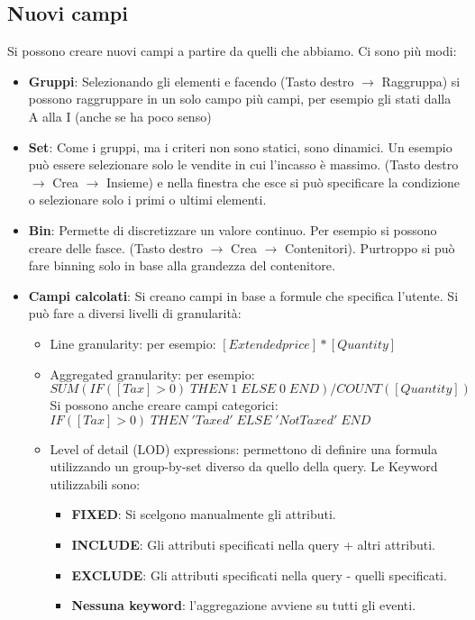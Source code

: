 \subsection{Nuovi campi}
Si possono creare nuovi campi a partire da quelli che abbiamo. Ci sono più modi:
\begin{itemize}
	\item \textbf{Gruppi}: Selezionando gli elementi e facendo (Tasto destro $\xrightarrow{}$ Raggruppa) si possono raggruppare in un solo campo più campi, per esempio gli stati dalla A alla I (anche se ha poco senso)
	\item \textbf{Set}: Come i gruppi, ma i criteri non sono statici, sono dinamici. Un esempio può essere selezionare solo le vendite in cui l'incasso è massimo. (Tasto destro $\xrightarrow{}$ Crea $\xrightarrow{}$ Insieme) e nella finestra che esce si può specificare la condizione o selezionare solo i primi o ultimi elementi.
	\item \textbf{Bin}: Permette di discretizzare un valore continuo. Per esempio si possono creare delle fasce. (Tasto destro $\xrightarrow{}$ Crea $\xrightarrow{}$ Contenitori). Purtroppo si può fare binning solo in base alla grandezza del contenitore.
	\item \textbf{Campi calcolati}: Si creano campi in base a formule che specifica l'utente. Si può fare a diversi livelli di granularità:
	\begin{itemize}
		\item Line granularity: per esempio: $[Extendedprice] * [Quantity]$
		\item Aggregated granularity: per esempio:\newline $SUM(IF([Tax]>0)\;THEN\;1\;ELSE\;0\; END)/COUNT([Quantity])$
		Si possono anche creare campi categorici:\newline
		$IF([Tax]>0)\;THEN\;'Taxed'\;ELSE\;'Not Taxed'\; END$
		\item Level of detail (LOD) expressions: permettono di definire una formula utilizzando un group-by-set diverso da quello della query. Le Keyword utilizzabili sono:
		\begin{itemize}
			\item \textbf{FIXED}: Si scelgono manualmente gli attributi.
			\item \textbf{INCLUDE}: Gli attributi specificati nella query + altri attributi.
			\item \textbf{EXCLUDE}: Gli attributi specificati nella query - quelli specificati.
			\item \textbf{Nessuna keyword}: l'aggregazione avviene su tutti gli eventi.
		\end{itemize}
	\end{itemize}
\end{itemize}
\newpage
